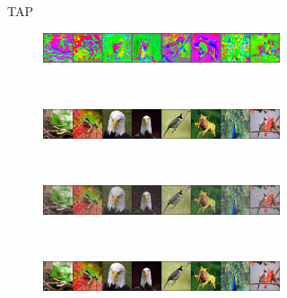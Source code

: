 \documentclass[conference]{IEEEtran}
\theoremstyle{definition}
\theoremstyle{remark}
\theoremstyle{proposition}
\begin{document}
\begin{figure}[htp!]
\begin{subfigure}{.90\textwidth}
	\caption{TAP~\citep{fowl2021tap}}
    \vspace{2em}
    \end{subfigure}
     \begin{subfigure}{.90\textwidth}
        \hspace{0.95em}
    	\begin{subfigure}{.90\textwidth}
    		\centering
    		\includegraphics[width=1.0\textwidth, valign=c]{samples/ImageNet-REM/pert_adv.png}
    	\end{subfigure}\\
        \hspace{0.75em}
    	\begin{subfigure}{.90\textwidth}
    		\centering
    		\includegraphics[width=1.0\textwidth, valign=c]{samples/ImageNet-REM/original_input.png}
    	\end{subfigure}\\
        \hspace{0.75em}
    	\begin{subfigure}{.90\textwidth}
    		\centering
    		\includegraphics[width=1.0\textwidth, valign=c]{samples/ImageNet-REM/init_0.png}
    	\end{subfigure}\\
        \hspace{0.95em}
    	\begin{subfigure}{.90\textwidth}
    		\centering
    		\includegraphics[width=1.0\textwidth, valign=c]{samples/ImageNet-REM/samples_0.png}
    \end{subfigure}

\end{subfigure}
\end{figure}
\end{document}
